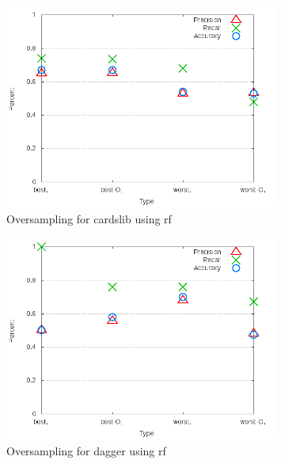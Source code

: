 \begin{figure}[!t]
\centering
\includegraphics[width=0.8\textwidth]{images/rf/test_4/cardslib_sample_range.png}
\caption{Oversampling for cardslib using \gls{rf}}
\label{fig:test_4_cardslib_rf}
\end{figure}

\begin{figure}[!t]
\centering
\includegraphics[width=0.8\textwidth]{images/rf/test_4/dagger_sample_range.png}
\caption{Oversampling for dagger using \gls{rf}}
\label{fig:test_4_dagger_rf}
\end{figure}


